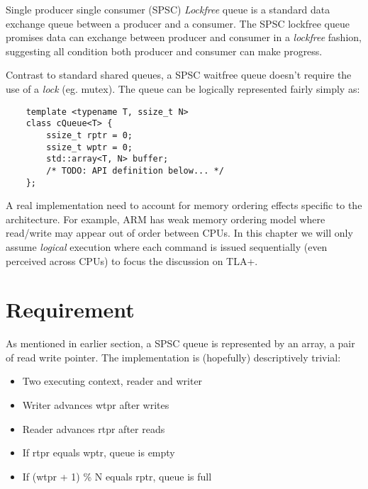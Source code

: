 \documentclass{report}
\begin{document}
Single producer single consumer (SPSC) \textit{Lockfree} queue is a standard
data exchange queue between a producer and a consumer. The SPSC lockfree queue
promises data can exchange between producer and consumer in a \textit{lockfree}
fashion, suggesting all condition both producer and consumer can make
progress.\newline

Contrast to standard shared queues, a SPSC waitfree queue doesn't require the
use of a \textit{lock} (eg. mutex). The queue can be logically represented
fairly simply as:

\begin{lstlisting}
    template <typename T, ssize_t N>
    class cQueue<T> { 
        ssize_t rptr = 0; 
        ssize_t wptr = 0; 
        std::array<T, N> buffer;
        /* TODO: API definition below... */
    };
\end{lstlisting}

A real implementation need to account for memory ordering effects specific to
the architecture. For example, ARM has weak memory ordering model where
read/write may appear out of order between CPUs. In this chapter we will only
assume \textit{logical} execution where each command is issued sequentially
(even perceived across CPUs) to focus the discussion on TLA+.
\section{Requirement}

As mentioned in earlier section, a SPSC queue is represented by an array, a pair
of read write pointer. The implementation is (hopefully) descriptively trivial:

\begin{itemize}
    \item Two executing context, reader and writer
    \item Writer advances wtpr after writes
    \item Reader advances rtpr after reads
    \item If rtpr equals wptr, queue is empty
    \item If (wtpr + 1) \% N equals rptr, queue is full
\end{itemize}
\end{document}

